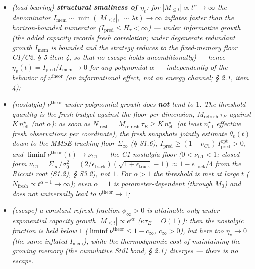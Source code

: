 \documentclass[12pt]{iopart}
\providecommand{\tightlist}{\setlength{\itemsep}{0pt}\setlength{\parskip}{0pt}}
\begin{document}
\begin{itemize}

\tightlist

\item

  \emph{(load-bearing) \textbf{structural smallness of \(\eta_v\)}: for \(|M_{\le t}| \propto t^\alpha \to \infty\) the denominator \(I_{\text{mem}} \sim \min(|M_{\le t}|,\ \sim\lambda t) \to \infty\) inflates faster than the horizon-bounded numerator (\(I_{\text{pred}} \le H_\tau < \infty\)) --- \emph{under informative growth} (the added capacity records fresh correlation; under degenerate \emph{redundant} growth \(I_{\text{mem}}\) is bounded and the strategy reduces to the fixed-memory floor C1/C2, § 5 item 4, so that no-escape holds unconditionally) --- hence \(\eta_v(t) = I_{\text{pred}}/I_{\text{mem}} \to 0\) for any polynomial \(\alpha\) --- independently of the behavior of \(\nu^{\text{theor}}\) (an informational effect, not an energy channel; § 2.1, item 4);}

\item

  \emph{(nostalgia) \(\nu^{\text{theor}}\) under polynomial growth does \textbf{not} tend to \(1\). The threshold quantity is the fresh budget against the floor-per-dimension, \(\dot M_{\text{refresh}}\,\tau_E\) against \(K\,n_{\text{eff}}^\star\) (not \(\alpha\)): as soon as \(N_{\text{fresh}} = \dot M_{\text{refresh}}\,\tau_E \ge K\,n_{\text{eff}}^\star\) (at least \(n_{\text{eff}}^\star\) effective fresh observations per coordinate), the fresh snapshots \emph{jointly} estimate \(\theta_v(t)\) down to the MMSE tracking floor \(\Sigma_\infty\) (§ S1.6), \(I_{\text{pred}} \ge (1-\nu_{C1})\,I_{\text{pred}}^{\text{opt}} > 0\), and \(\liminf\nu^{\text{theor}}(t) \to \nu_{C1}\) --- the C1 nostalgia floor (\(0 < \nu_{C1} < 1\); closed form \(\nu_{C1} = \Sigma_\infty/\sigma_0^2 = (2/\epsilon_{\text{track}})(\sqrt{1+\epsilon_{\text{track}}}-1) \approx 1 - \epsilon_{\text{track}}/4\) from the Riccati root (S1.2), § S3.2), not \(1\). For \(\alpha > 1\) the threshold is met at large \(t\) (\(N_{\text{fresh}} \propto t^{\alpha-1} \to \infty\)); even \(\alpha = 1\) is parameter-dependent (through \(M_0\)) and does not universally lead to \(\nu^{\text{theor}} \to 1\);}

\item

  \emph{(escape) a constant refresh fraction \(\phi_\infty > 0\) is attainable only under exponential capacity growth \(|M_{\le t}| \propto e^{\kappa t}\) (\(\kappa\tau_E = O(1)\)): then the nostalgic fraction is held below \(1\) (\(\liminf\nu^{\text{theor}} \le 1 - c_\infty\), \(c_\infty > 0\)), but here too \(\eta_v \to 0\) (the same inflated \(I_{\text{mem}}\)), while the thermodynamic cost of maintaining the growing memory (the cumulative Still bond, § 2.1) diverges --- there is no escape.}

\end{itemize}
\end{document}
